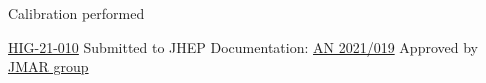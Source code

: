 {  \vspace{-0.3cm}

  \threeColumns
      {}
      {}
      {
          
        \footnotesize
        \vspace{1.3cm}

        Calibration performed

        \vspace{0.5cm}
        
        \href{http://cms-results.web.cern.ch/cms-results/public-results/publications/HIG-21-010/index.html}{\textcolor{kBlue}{HIG-21-010}}
        Submitted to JHEP\newline
        \vspace{0.1cm}Documentation: \href{https://cms.cern.ch/iCMS/user/noteinfo?cmsnoteid=CMS\%20AN-2021/019}{\textcolor{kBlue}{AN 2021/019}}\newline
        \vspace{0.1cm}Approved by \href{https://indico.cern.ch/event/1042288/contributions/4380251/attachments/2256031/3920589/updated_TopTag_JMAR_06Jul2021.pdf}{\textcolor{kBlue}{JMAR group}}

      }
}
  
